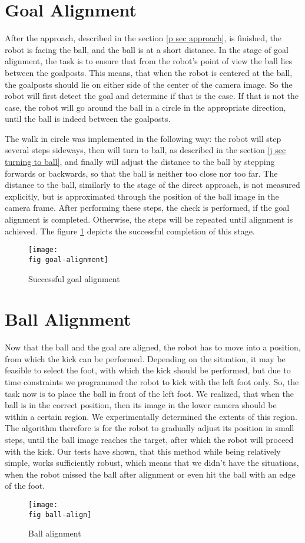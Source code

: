 \section{Goal Alignment}
\label{p sec goal align}

After the approach, described in the section \ref{p sec approach}, is finished,
the robot is facing the ball, and the ball is at a short distance. In the stage
of goal alignment, the task is to ensure that from the robot's point of view
the ball lies between the goalposts. This means, that when the robot is
centered at the ball, the goalposts should lie on either side of the center of
the camera image. So the robot will first detect the goal and determine if that
is the case. If that is not the case, the robot will go around the ball in a
circle in the appropriate direction, until the ball is indeed between the
goalposts.

The walk in circle was implemented in the following way: the robot will step
several steps sideways, then will turn to ball, as described in the section
\ref{j sec turning to ball}, and finally will adjust the distance to the ball
by stepping forwards or backwards, so that the ball is neither too close nor
too far. The distance to the ball, similarly to the stage of the direct
approach, is not measured explicitly, but is approximated through the position
of the ball image in the camera frame. After performing these steps, the check
is performed, if the goal alignment is completed. Otherwise, the steps will be
repeated until alignment is achieved. The figure \ref{p figure goal-alignment}
depicts the successful completion of this stage.

\begin{figure}[ht]
  \texttt{[image: \\fig goal-alignment]}
  \caption{Successful goal alignment}
  \label{p figure goal-alignment}
\end{figure}

\section{Ball Alignment}

Now that the ball and the goal are aligned, the robot has to move into a
position, from which the kick can be performed. Depending on the situation, it
may be feasible to select the foot, with which the kick should be performed,
but due to time constraints we programmed the robot to kick with the left foot
only. So, the task now is to place the ball in front of the left foot. We
realized, that when the ball is in the correct position, then its image in the
lower camera should be within a certain region. We experimentally determined
the extents of this region. The algorithm therefore is for the robot to
gradually adjust its position in small steps, until the ball image reaches the
target, after which the robot will proceed with the kick. Our tests have shown,
that this method while being relatively simple, works sufficiently robust,
which means that we didn't have the situations, when the robot missed the ball
after alignment or even hit the ball with an edge of the foot.

\begin{figure}[ht]
  \texttt{[image: \\fig ball-align]}
  \caption{Ball alignment}
  \label{p figure ball-alignment}
\end{figure}

